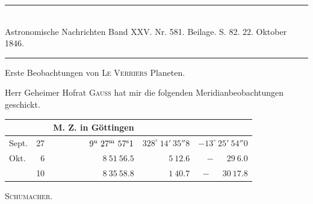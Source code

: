 \clearpage
{}
\hypertarget{native-476-planet}{}
\begin{center}
\rule{0.55\linewidth}{0.4pt}\\[2pt]
Astronomische Nachrichten Band XXV. Nr. 581. Beilage. S. 82. 22. Oktober 1846.\\[2pt]
\rule{0.55\linewidth}{0.4pt}
\end{center}

\begin{center}Erste Beobachtungen von \textsc{Le Verriers} Planeten.\end{center}

Herr Geheimer Hofrat \textsc{Gauss} hat mir die folgenden Meridianbeobachtungen geschickt.

\begin{center}
\setlength{\tabcolsep}{5pt}
\begin{tabular}{lr|r|r|r}
\multicolumn{2}{l|}{} & M. Z. in Göttingen & & \\
\hline
Sept. & 27 & $9^{\rm u}\ 27^{\rm m}\ 57^{\rm s}1$ & $328^\circ\ 14'\ 35''8$ & $-13^\circ\ 25'\ 54''0$ \\
Okt. & 6 & $8\ 51\ 56.5$ & $5\ 12.6$ & $-\phantom{13^\circ\ }29\ 6.0$ \\
 & 10 & $8\ 35\ 58.8$ & $1\ 40.7$ & $-\phantom{13^\circ\ }30\ 17.8$ \\
\end{tabular}
\end{center}
\begin{flushright}\textsc{Schumacher}.\end{flushright}

